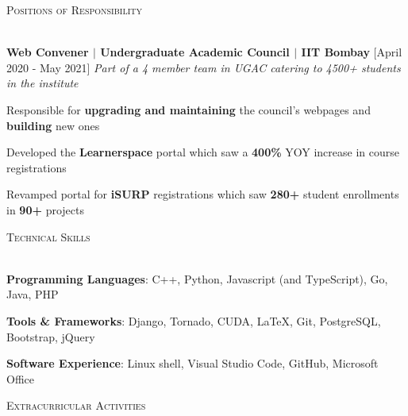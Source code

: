 \documentclass[12pt]{article}
\renewcommand{\section}[1]{
    \vspace*{10pt}
    \textsc{\Large{#1}}
    \vspace*{-10pt} \\ \hspace*{-5pt} 
    \hrulefill \\
    \vspace*{-15pt}
}
\newcommand{\smallbullet}{
    \small$\bullet$
}
\newenvironment{bullet-list-major}{
    \begin{list}{
        \smallbullet
    }{
        \setlength\leftmargin{15pt}\topsep 0pt \itemsep -4pt
    }
} {
    \end{list}
}
\newcommand{\bigblock}[3]{
    {
        \hspace*{-8pt} \textbf{#1} \hfill #2 \newline
        \textit{#3}
    }
}
\newenvironment{bullet-list-minor}{
    \begin{list}{
        \smallbullet
    }{
        \setlength\leftmargin{30pt}\topsep 0pt \itemsep -3pt
    }
} {
    \end{list}
}
\begin{document}

    \section{Positions of Responsibility}

    \bigblock{
        Web Convener \(|\) Undergraduate Academic Council \(|\) IIT Bombay
    }{
        [April 2020 - May 2021]
    }{
        Part of a 4 member team in UGAC catering to 4500+ students in the institute
    }
    \begin{bullet-list-minor}
        \item Responsible for \textbf{upgrading and maintaining} the council's webpages and \textbf{building} new ones
        \item Developed the \textbf{Learnerspace} portal which saw a \textbf{400\%} YOY increase in course registrations
        \item Revamped portal for \textbf{iSURP} registrations which saw \textbf{280+} student enrollments in \textbf{90+} projects
    \end{bullet-list-minor}
    

    \section{Technical Skills}

    \begin{bullet-list-major}
        \item \textbf{Programming Languages}: C++, Python, Javascript (and TypeScript), Go, Java, PHP
        \item \textbf{Tools \& Frameworks}: Django, Tornado, CUDA, LaTeX, Git, PostgreSQL, Bootstrap, jQuery
        \item \textbf{Software Experience}: Linux shell, Visual Studio Code, GitHub, Microsoft Office
    \end{bullet-list-major} 


    \section{Extracurricular Activities}
\end{document}
